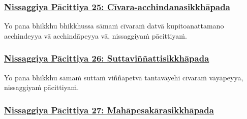 {
\subsubsection*{\hyperref[forf-exp25]{Nissaggiya Pācittiya 25: Cīvara-acchindanasikkhāpada}}
\label{np25}

Yo pana bhikkhu bhikkhussa sāmaṁ cīvaraṁ datvā kupito\makeatletter\hyperlink{endnote208-appendix}\makeatother \thinspace anattamano acchindeyya vā acchindāpeyya vā, nissaggiyaṁ pācittiyaṁ.



\subsubsection*{\hyperref[forf-exp26]{Nissaggiya Pācittiya 26: Suttaviññattisikkhāpada}}
\label{np26}

Yo pana bhikkhu sāmaṁ suttaṁ viññāpetvā tantavāyehi cīvaraṁ vāyāpeyya, nissaggiyaṁ pācittiyaṁ.



\subsubsection*{\hyperref[forf-exp27]{Nissaggiya Pācittiya 27: Mahāpesakārasikkhāpada}}
\label{np27}

}
